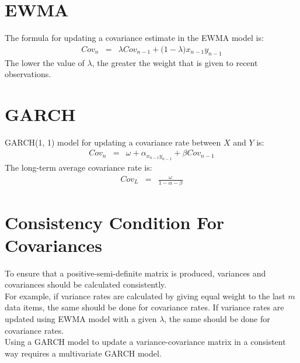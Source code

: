 \section{EWMA}
The formula for updating a covariance estimate in the EWMA model is:
\begin{eqnarray}
	Cov_{n} &=& \lambda Cov_{n - 1} + \big(1 - \lambda\big) x_{n - 1}y_{n - 1}
\end{eqnarray}
The lower the value of $\lambda$, the greater the weight that is given to recent observations.

\section{GARCH}
GARCH(1, 1) model for updating a covariance rate between $X$ and $Y$ is:
\begin{eqnarray}
	Cov_{n} &=& \omega + \alpha_{x_{n - 1}y_{n - 1}} + \beta Cov_{n - 1}
\end{eqnarray}
The long-term average covariance rate is:
\begin{eqnarray}
	Cov_{L} &=& \frac{\omega}{1 - \alpha - \beta}
\end{eqnarray}

\section{Consistency Condition For Covariances}
To ensure that a positive-semi-definite matrix is produced, variances and covariances should be calculated consistently.\\
For example, if variance rates are calculated by giving equal weight to the last $m$ data items, the same should be done for covariance rates. If variance rates are updated using EWMA model with a given $\lambda$, the same should be done for covariance rates.\\
Using a GARCH model to update a variance-covariance matrix in a consistent way requires a multivariate GARCH model.

